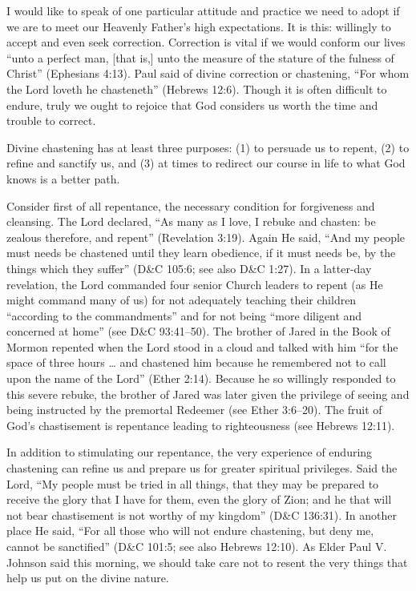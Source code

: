 \documentclass[letterpaper, 11pt]{report}
\begin{document}
I would like to speak of one particular attitude and practice we need to adopt if we are to meet our Heavenly Father’s high expectations. It is this: willingly to accept and even seek correction. Correction is vital if we would conform our lives “unto a perfect man, [that is,] unto the measure of the stature of the fulness of Christ” (Ephesians 4:13). Paul said of divine correction or chastening, “For whom the Lord loveth he chasteneth” (Hebrews 12:6). Though it is often difficult to endure, truly we ought to rejoice that God considers us worth the time and trouble to correct.

Divine chastening has at least three purposes: (1) to persuade us to repent, (2) to refine and sanctify us, and (3) at times to redirect our course in life to what God knows is a better path.

Consider first of all repentance, the necessary condition for forgiveness and cleansing. The Lord declared, “As many as I love, I rebuke and chasten: be zealous therefore, and repent” (Revelation 3:19). Again He said, “And my people must needs be chastened until they learn obedience, if it must needs be, by the things which they suffer” (D\&C 105:6; see also D\&C 1:27). In a latter-day revelation, the Lord commanded four senior Church leaders to repent (as He might command many of us) for not adequately teaching their children “according to the commandments” and for not being “more diligent and concerned at home” (see D\&C 93:41–50). The brother of Jared in the Book of Mormon repented when the Lord stood in a cloud and talked with him “for the space of three hours … and chastened him because he remembered not to call upon the name of the Lord” (Ether 2:14). Because he so willingly responded to this severe rebuke, the brother of Jared was later given the privilege of seeing and being instructed by the premortal Redeemer (see Ether 3:6–20). The fruit of God’s chastisement is repentance leading to righteousness (see Hebrews 12:11).

In addition to stimulating our repentance, the very experience of enduring chastening can refine us and prepare us for greater spiritual privileges. Said the Lord, “My people must be tried in all things, that they may be prepared to receive the glory that I have for them, even the glory of Zion; and he that will not bear chastisement is not worthy of my kingdom” (D\&C 136:31). In another place He said, “For all those who will not endure chastening, but deny me, cannot be sanctified” (D\&C 101:5; see also Hebrews 12:10). As Elder Paul V. Johnson said this morning, we should take care not to resent the very things that help us put on the divine nature.
\end{document}
